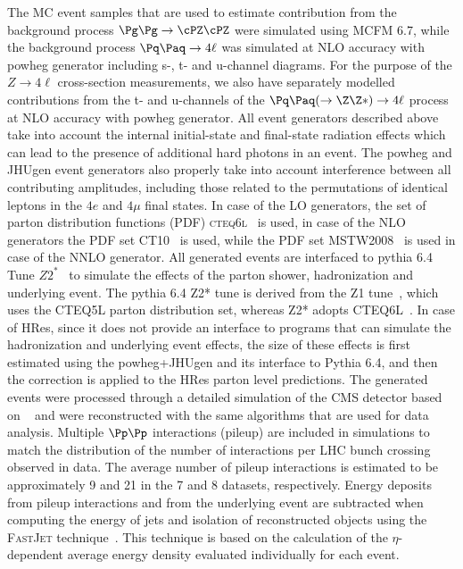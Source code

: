 The MC event samples that are used to estimate contribution from the background process $\Pg\Pg \rightarrow \cPZ\cPZ$ were simulated using
{\sc MCFM 6.7}, while the background process $\Pq\Paq \to 4\ell$ was simulated at NLO accuracy with {\sc powheg} generator including s-, t- and u-channel
diagrams. For the purpose of the $Z\rightarrow4\ell$ cross-section measurements, we also have separately modelled contributions from the t- and u-channels
of the $\Pq\Paq(\to \Z\Z*)\to 4\ell$ process at NLO accuracy with {\sc powheg} generator.
All event generators described above take into account the internal initial-state and final-state radiation effects which can lead to the
presence of additional hard photons in an event.
The {\sc powheg} and {\sc JHUgen} event generators also properly take into account interference between all contributing amplitudes,
 including those related to the permutations of identical leptons in the $4e$ and $4\mu$ final states.
In case of the LO generators, the set of parton distribution functions (PDF) \textsc{cteq6l}~\cite{cteq66} is used,
in case of the NLO generators the PDF set \textsc{CT10}~\cite{CT10} is used,
while the PDF set \textsc{MSTW2008}~\cite{MSTW08} is used in case of the NNLO generator.
All generated events are interfaced to {\sc pythia 6.4} Tune $Z2^{*}$~\cite{Chatrchyan:2011id} to simulate the effects of the parton shower, hadronization
and underlying event.
The {\sc pythia 6.4} Z2* tune is derived from the Z1 tune~\cite{Field:2010bc}, which uses the CTEQ5L parton distribution set, whereas Z2* adopts 
CTEQ6L~\cite{Pumplin:2002vw}.
In case of {\sc HRes}, since it does not provide an interface to programs that can simulate the hadronization and underlying event effects, the size of
these effects is first estimated using the {\sc powheg+JHUgen} and its interface to {\sc Pythia 6.4}, and then the correction is applied to the {\sc HRes}
parton level predictions.
The generated events were processed through a detailed simulation of the CMS detector based on
\GEANTfour~\cite{GEANT} and were reconstructed with the same algorithms
that are used for data analysis.
Multiple $\Pp\Pp$ interactions (pileup) are included in simulations to match the distribution of the number of
interactions per LHC bunch crossing observed in data.  The average
number of pileup interactions is estimated to be approximately 9 and 21 in the 7 and 8 \TeV datasets, respectively.
Energy deposits from pileup interactions and from the underlying event are subtracted
when computing the energy of jets and isolation of reconstructed objects
using the \textsc{FastJet} technique~\cite{Cacciari:2007fd,Cacciari:2008gn,Cacciari:2011ma}.
This technique is based on the calculation of the $\eta$-dependent average energy density %
evaluated individually for each event.

